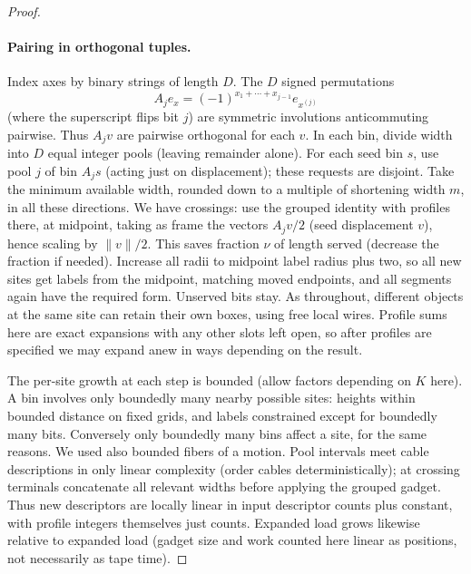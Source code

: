 \documentclass[11pt,letterpaper]{article}
\theoremstyle{definition}
\numberwithin{equation}{section}
\begin{document}
\begin{proof}
\paragraph{Pairing in orthogonal tuples.}
Index axes by binary strings of length $D$. The $D$ signed
permutations
\[
  A_j e_x= (-1)^{x_1+\cdots+x_{j-1}} e_{x^{(j)}}
\]
(where the superscript flips bit $j$) are symmetric involutions anticommuting pairwise. Thus
$A_j v$ are pairwise orthogonal for each $v$. In each bin, divide width into $D$ equal integer
pools (leaving remainder alone). For each seed bin $s$, use pool $j$ of bin $A_j s$ (acting just
on displacement); these requests are disjoint. Take the minimum available width, rounded
down to a multiple of shortening width $m$, in all these directions. We have crossings: use the
grouped identity with profiles there, at midpoint, taking as frame the vectors $A_j v/2$ (seed
displacement $v$), hence scaling by $\| v\| /2$. This saves fraction $\nu$ of length served (decrease
the fraction if needed). Increase all radii to midpoint label radius plus two, so all new
sites get labels from the midpoint, matching moved endpoints, and all segments again have
the required form. Unserved bits stay. As throughout, different objects at the same site
can retain their own boxes, using free local wires. Profile sums here are exact expansions
with any other slots left open, so after profiles are specified we may expand anew in ways
depending on the result.

The per-site growth at each step is bounded (allow factors depending on $K$ here). A
bin involves only boundedly many nearby possible sites: heights within bounded distance
on fixed grids, and labels constrained except for boundedly many bits. Conversely only
boundedly many bins affect a site, for the same reasons. We used also bounded fibers of
a motion. Pool intervals meet cable descriptions in only linear complexity (order cables
deterministically); at crossing terminals concatenate all relevant widths before applying the
grouped gadget. Thus new descriptors are locally linear in input descriptor counts plus
constant, with profile integers themselves just counts. Expanded load grows likewise relative
to expanded load (gadget size and work counted here linear as positions, not necessarily as
tape time).


\end{proof}
\end{document}
